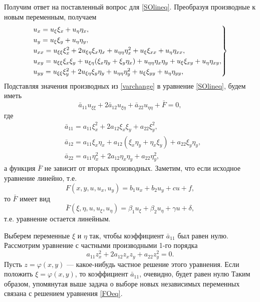 Получим ответ на поставленный вопрос для \eqref{SOlineq}. Преобразуя производные к новым переменным, получаем
\begin{equation} \label{varchange}
	\begin{rcases}
		u_x = u_{\xi} \xi_{x} + u_{\eta} \eta_{x}, \\
		u_y = u_{\xi} \xi_{y} + u_{\eta} \eta_{y}, \\
		u_{xx} = u_{\xi\xi} \xi_{x}^2 + 2 u_{\xi\eta} \xi_{x} \eta_{x} + u_{\eta\eta} \eta^2_{x} + u_{\xi} \xi_{xx} + u_{\eta} \eta_{xx}, \\
		u_{xy} = u_{\xi\xi} \xi_{x} \xi_{y} + u_{\xi\eta}(\xi_x \eta_y + \xi_y \eta_x) + u_{\eta\eta} \eta_x \eta_y + u_{\xi} \xi_{xy} + u_{\eta} \eta_{xy}, \\
		u_{yy} = u_{\xi\xi} \xi_{y}^2 + 2 u_{\xi\eta} \xi_{y} \eta_{y} + u_{\eta\eta} \eta^2_{y} + u_{\xi} \xi_{yy} + u_{\eta} \eta_{yy},
	\end{rcases}
\end{equation}
Подставляя значения производных из \eqref{varchange} в уравнение \eqref{SOlineq}, будем иметь 
\begin{equation} \label{SOeqCHANGED}
	\bar{a}_{11} u_{\xi\xi} + 2 \bar{a}_{12} u_{\xi\eta} + \bar{a}_{22} u_{\eta\eta} + \bar{F} = 0,
\end{equation}
где 
\begin{align*}
	&\bar{a}_{11} = a_{11} \xi^2_{x} + 2 a_{12} \xi_x \xi_y + a_{22} \xi^2_y, \\
	&\bar{a}_{12} = a_{11} \xi_x \eta_x + a_{12} (\xi_x \eta_y + \eta_x \xi_y) + a_{22} \xi_{y} \eta_{y}, \\
	&\bar{a}_{22} = a_{11} \eta^2_{x} + 2 a_{12} \eta_x \eta_y + a_{22} \eta^2_y,
\end{align*}
а функция $\bar{F}$ не зависит от вторых производных. Заметим, что если исходное уравнение линейно, т.е. 
\begin{equation*}
	F(x, y, u, u_x, u_y) = b_1 u_x + b_2 u_y + c u + f,
\end{equation*}
то $\bar{F}$ имеет вид 
\begin{equation*}
	\bar{F}(\xi, \eta, u, u_{\xi}, u_{\eta}) = \beta_1 u_{\xi} + \beta_2 u_{\eta} + \gamma u + \delta,
\end{equation*}
т.е. уравнение остается линейным. 

Выберем переменные $\xi$ и $\eta$ так, чтобы коэффициент $\bar{a}_{11}$ был равен нулю. Рассмотрим уравнение с частными производными 1-го порядка
\begin{equation} \label{FOeq}
	a_11 z^2_x + 2 a_{12} z_x z_y + a_{22} z_y^2 = 0.
\end{equation}
Пусть $z = \varphi(x, y)$ --- какое-нибудь частное решение этого уравнения. Если положить $\xi = \varphi(x, y)$, то коэффициент $\bar{a}_{11}$, очевидно, будет равен нулю Таким образом, упомянутая выше задача о выборе новых независимых переменных связана с решением уравнения \eqref{FOeq}.  

